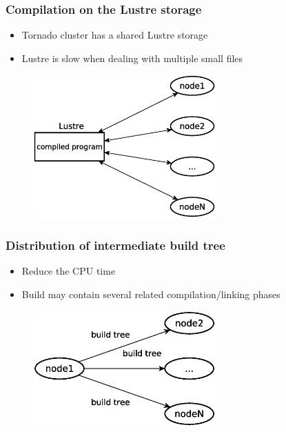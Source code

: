 \begin{frame}
\frametitle{Compilation on the Lustre storage}
\begin{itemize}
\item Tornado cluster has a shared Lustre storage
\item Lustre is slow when dealing with multiple small files
\end{itemize}
	\begin{figure}
		\includegraphics[width=70mm]{image/compLustre}
	\end{figure}	
\end{frame}


\begin{frame}
\frametitle{Distribution of intermediate build tree}
\begin{itemize}
\item Reduce the CPU time
\item Build may contain several related compilation/linking phases
\end{itemize}
	\begin{figure}
		\includegraphics[width=70mm]{image/compTree}
	\end{figure}	
\end{frame}


